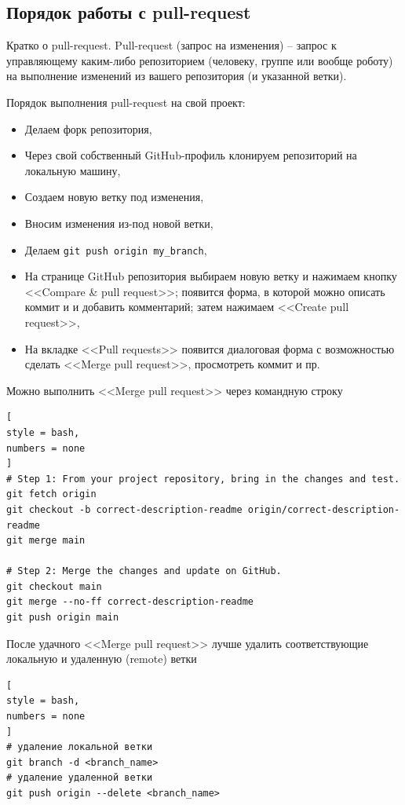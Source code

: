 \documentclass[%
	11pt,
	a4paper,
	utf8,
		]{article}
\begin{document}
\subsection{Порядок работы с pull-request}

Кратко о pull-request. Pull-request (запрос на изменения) -- запрос к управляющему каким-либо репозиторием (человеку, группе или вообще роботу) на выполнение изменений из вашего репозитория (и указанной ветки).

Порядок выполнения pull-request на свой проект:
\begin{itemize}
	\item Делаем форк репозитория,
	
	\item Через свой собственный GitHub-профиль клонируем репозиторий на локальную машину,
	
	\item Создаем новую ветку под изменения,
	
	\item Вносим изменения из-под новой ветки,
	
	\item Делаем \texttt{git push origin my\_branch},
	
	\item На странице GitHub репозитория выбираем новую ветку и нажимаем кнопку <<Compare \& pull request>>; появится форма, в которой можно описать коммит и и добавить комментарий; затем нажимаем <<Create pull request>>,
	
	\item На вкладке <<Pull requests>> появится диалоговая форма с возможностью сделать <<Merge pull request>>, просмотреть коммит и пр.
\end{itemize}

Можно выполнить <<Merge pull request>> через командную строку
\begin{lstlisting}[
style = bash,
numbers = none
]
# Step 1: From your project repository, bring in the changes and test.
git fetch origin
git checkout -b correct-description-readme origin/correct-description-readme
git merge main

# Step 2: Merge the changes and update on GitHub.
git checkout main
git merge --no-ff correct-description-readme
git push origin main
\end{lstlisting}

После удачного <<Merge pull request>> лучше удалить соответствующие локальную и удаленную (remote) ветки
\begin{lstlisting}[
style = bash,
numbers = none	
]
# удаление локальной ветки
git branch -d <branch_name>
# удаление удаленной ветки
git push origin --delete <branch_name>
\end{lstlisting}
\end{document}
